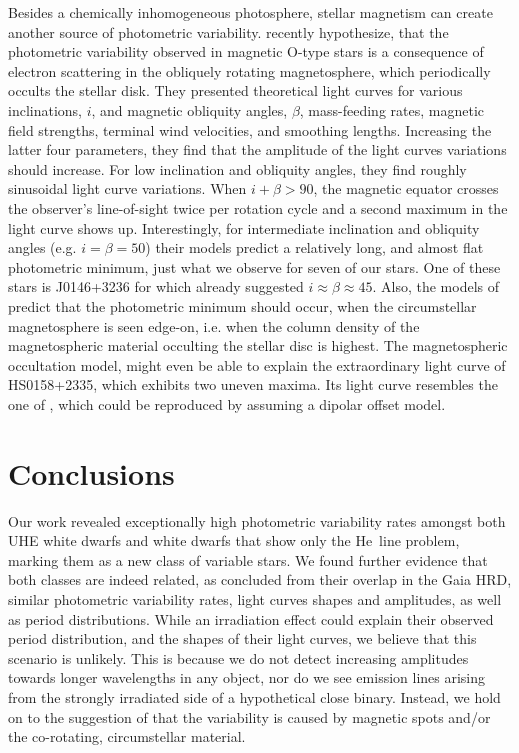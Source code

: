 \documentclass{aa}
\newcounter{Rco}
\newcommand{\Ionst}[1]{\setcounter{Rco}{#1}\Roman{Rco}}
\newcommand{\Ion}[2]{\mbox{#1\,{\scriptsize\Ionst{#2}}}}
\begin{document}
Besides a chemically inhomogeneous photosphere, stellar magnetism can create
another source of photometric variability.
\cite{Munoz+2020} recently hypothesize, that the photometric variability
observed in magnetic O-type stars is a consequence of electron scattering
in the obliquely rotating magnetosphere, which periodically occults the
stellar disk. They presented theoretical light curves for various
inclinations, $i$, and magnetic obliquity angles, $\beta$, mass-feeding rates,
magnetic field strengths, terminal wind velocities, and smoothing lengths.
Increasing the latter four parameters, they find that the amplitude of the
light curves variations should increase. For low inclination and obliquity
angles, they find roughly sinusoidal light curve variations. When
$i+\beta>90$\textdegree, the magnetic equator crosses the observer's
line-of-sight twice per rotation cycle and a second maximum in the light
curve shows up. Interestingly, for intermediate inclination and obliquity angles
(e.g. $i=\beta=50$\textdegree) their models predict a relatively long, and
almost flat photometric minimum, just what we observe for seven of our stars.
One of these stars is J0146+3236 for which \cite{Reindl+2019} already
suggested $i\approx\beta\approx45$\textdegree. Also, the models of
\cite{Munoz+2020} predict that the photometric minimum should occur, when
the circumstellar magnetosphere is seen edge-on, i.e. when the column density of
the magnetospheric material occulting the stellar disc is highest.
The magnetospheric occultation model, might even be able to explain the
extraordinary light curve of HS0158+2335, which exhibits two uneven maxima.
Its light curve resembles the one of , which could be
reproduced by \cite{Munoz+2020} assuming a dipolar offset model.
 
 
\section{Conclusions}
\label{sect:conclusions}
 
Our work revealed exceptionally high photometric variability rates amongst
both UHE white dwarfs and white dwarfs that show only the \Ion{He}{2} line
problem, marking them as a new class of variable stars.
We found further evidence that both classes are indeed related,
as concluded from their overlap in the Gaia HRD, similar
photometric variability rates, light curves shapes and amplitudes, as well as
period distributions.
While an irradiation effect could explain their observed period distribution,
and the shapes of their light curves, we believe that this scenario is
unlikely. This is because we do not detect increasing amplitudes towards
longer wavelengths in any object, nor do we see emission lines arising from
the strongly irradiated side of a hypothetical close binary.
Instead, we hold on to the suggestion of \cite{Reindl+2019} that the
variability is caused by magnetic spots and/or the co-rotating, circumstellar
material.
 
\end{document}
